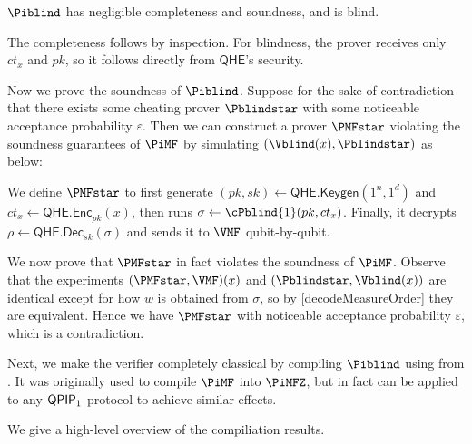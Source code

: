 \begin{thm}
	\label{thm:BlindBQP}
	$\Piblind$ has negligible completeness and soundness, and is blind.
\end{thm}
\begin{prf}
	The completeness follows by inspection.
	For blindness, the prover receives only $ct_x$ and $pk$, so it follows directly from $\mathsf{QHE}$'s security.
	
	Now we prove the soundness of $\Piblind$.
	Suppose for the sake of contradiction that there exists some cheating prover $\Pblindstar$ with some noticeable acceptance probability $\varepsilon$.
	Then we can construct a prover $\PMFstar$ violating the soundness guarantees of $\PiMF$ by simulating $(\Vblind(x), \Pblindstar)$ as below:

	We define $\PMFstar$ to first generate
	$(pk, sk)\leftarrow\mathsf{QHE.Keygen}(1^n, 1^d)$
	and
	$ct_x\leftarrow\mathsf{QHE.Enc}_{pk}(x)$,
	then runs $\sigma\leftarrow\cPblind{1}(pk, ct_x)$.
	Finally, it decrypts
	$\rho\leftarrow\mathsf{QHE.Dec}_{sk}(\sigma)$
	and sends it to $\VMF$ qubit-by-qubit.

	We now prove that $\PMFstar$ in fact violates the soundness of $\PiMF$.
	Observe that the experiments $(\PMFstar, \VMF)(x)$ and $(\Pblindstar, \Vblind(x))$ are identical except for how $w$ is obtained from $\sigma$,
	so by \cref{decodeMeasureOrder} they are equivalent.
	Hence we have $\PMFstar$ with noticeable acceptance probability $\varepsilon$, which is a contradiction.
\end{prf}


Next, we make the verifier completely classical by compiling $\Piblind$ using  from \cite{FOCS:Mahadev18a}.
It was originally used to compile $\PiMF$ into $\PiMFZ$,
but in fact can be applied to any $\operatorname{\mathsf{QPIP}}_1$ protocol to achieve similar effects.

We give a high-level overview of the compiliation results.

